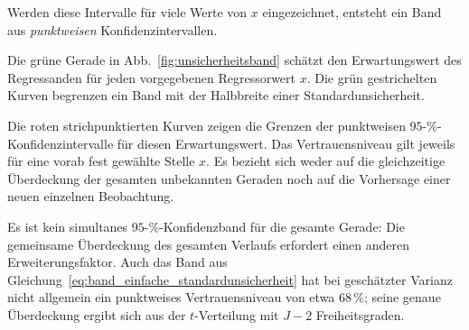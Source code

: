 Werden diese Intervalle für viele Werte von $x$ eingezeichnet,
entsteht ein Band aus \emph{punktweisen} Konfidenzintervallen.

Die grüne Gerade in Abb.~\ref{fig:unsicherheitsband}
schätzt den Erwartungswert des Regressanden für jeden
vorgegebenen Regressorwert $x$. Die grün gestrichelten
Kurven begrenzen ein Band mit der Halbbreite einer
Standardunsicherheit.

Die roten strichpunktierten Kurven zeigen die Grenzen
der punktweisen $95$-\%-Konfidenzintervalle für diesen
Erwartungswert. Das Vertrauensniveau gilt jeweils für
eine vorab fest gewählte Stelle $x$. Es bezieht sich
weder auf die gleichzeitige Überdeckung der gesamten
unbekannten Geraden noch auf die Vorhersage einer
neuen einzelnen Beobachtung.

Es ist kein simultanes $95$-\%-Konfidenzband für die gesamte Gerade:
Die gemeinsame Überdeckung des gesamten Verlaufs erfordert einen
anderen Erweiterungsfaktor. Auch das Band aus
Gleichung~\eqref{eq:band_einfache_standardunsicherheit} hat bei
geschätzter Varianz nicht allgemein ein punktweises Vertrauensniveau
von etwa $68\,\%$; seine genaue Überdeckung ergibt sich aus der
$t$-Verteilung mit $J-2$ Freiheitsgraden.





